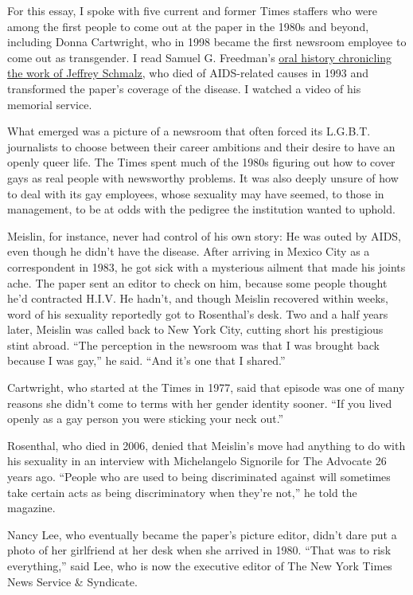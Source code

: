 For this essay, I spoke with five current and former Times staffers who
were among the first people to come out at the paper in the 1980s and
beyond, including Donna Cartwright, who in 1998 became the first
newsroom employee to come out as transgender. I read Samuel G.
Freedman's
\href{http://www.tabletmag.com/scroll/191965/remembering-jeff-schmalz-a-trailblazing-reporter-who-covered-aids}{oral
history chronicling the work of Jeffrey Schmalz}, who died of
AIDS-related causes in 1993 and transformed the paper's coverage of the
disease. I watched a video of his memorial service.

What emerged was a picture of a newsroom that often forced its L.G.B.T.
journalists to choose between their career ambitions and their desire to
have an openly queer life. The Times spent much of the 1980s figuring
out how to cover gays as real people with newsworthy problems. It was
also deeply unsure of how to deal with its gay employees, whose
sexuality may have seemed, to those in management, to be at odds with
the pedigree the institution wanted to uphold.

Meislin, for instance, never had control of his own story: He was outed
by AIDS, even though he didn't have the disease. After arriving in
Mexico City as a correspondent in 1983, he got sick with a mysterious
ailment that made his joints ache. The paper sent an editor to check on
him, because some people thought he'd contracted H.I.V. He hadn't, and
though Meislin recovered within weeks, word of his sexuality reportedly
got to Rosenthal's desk. Two and a half years later, Meislin was called
back to New York City, cutting short his prestigious stint abroad. ``The
perception in the newsroom was that I was brought back because I was
gay,'' he said. ``And it's one that I shared.''

Cartwright, who started at the Times in 1977, said that episode was one
of many reasons she didn't come to terms with her gender identity
sooner. ``If you lived openly as a gay person you were sticking your
neck out.''

Rosenthal, who died in 2006, denied that Meislin's move had anything to
do with his sexuality in an interview with Michelangelo Signorile for
The Advocate 26 years ago. ``People who are used to being discriminated
against will sometimes take certain acts as being discriminatory when
they're not,'' he told the magazine.

Nancy Lee, who eventually became the paper's picture editor, didn't dare
put a photo of her girlfriend at her desk when she arrived in 1980.
``That was to risk everything,'' said Lee, who is now the executive
editor of The New York Times News Service \& Syndicate.

